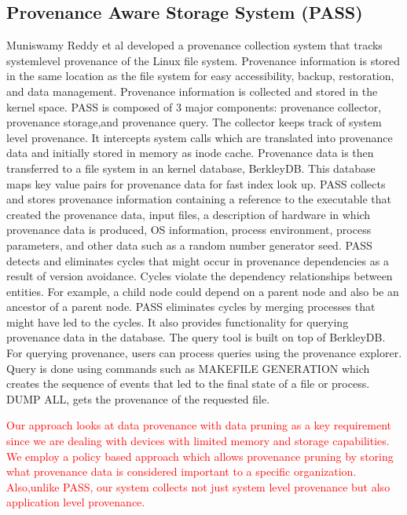 \subsection{Provenance Aware Storage System (PASS)}
Muniswamy Reddy
et al \cite{muniswamy_reddy} developed a provenance collection system that tracks  system\-level provenance of the Linux file system. Provenance information
is stored in the same location as the file system for easy accessibility, backup,
restoration, and data management. Provenance information is collected and stored in
the kernel space. PASS is composed of 3 major components: provenance collector, provenance storage,and provenance query. The collector keeps track of system level provenance. It intercepts system calls which are translated into provenance data and initially stored in memory as inode cache. Provenance data is then transferred to a file system in an kernel database, BerkleyDB. This database maps key value pairs for provenance data for fast index look up. PASS collects and stores provenance information containing a reference to the executable that created the provenance data, input files, a description of hardware in which provenance data is produced, OS information, process environment, process parameters, and other data such as a random number generator seed. PASS detects and eliminates cycles that might occur in provenance dependencies as a result of version avoidance. Cycles violate the dependency relationships between entities. For example, a child node could depend on a parent node and also be an ancestor of a parent node. PASS eliminates cycles by merging processes that might have led to the cycles. It also provides functionality for querying provenance data in the database. The query tool is built on top of BerkleyDB. For querying provenance, users can process queries using the provenance explorer. Query is done using commands such as MAKEFILE  GENERATION which creates the sequence of events that led to the final state of a file or process. DUMP ALL, gets the provenance of the requested file.


\textcolor{red}{ 
Our approach looks at data provenance with data pruning as a key requirement since we are dealing with devices with limited memory and storage capabilities. We employ a policy based approach which allows provenance pruning by storing what provenance data is considered important to a specific organization. Also,unlike PASS, our system collects not just system level provenance but also application level provenance.}

